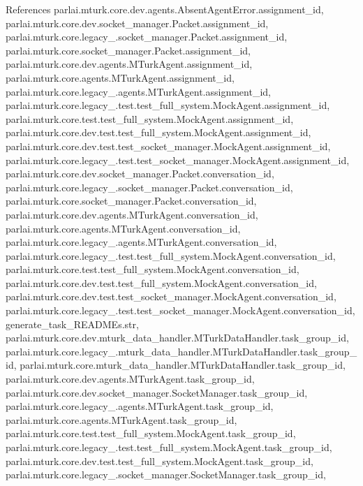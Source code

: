 References parlai.\+mturk.\+core.\+dev.\+agents.\+Absent\+Agent\+Error.\+assignment\+\_\+id, parlai.\+mturk.\+core.\+dev.\+socket\+\_\+manager.\+Packet.\+assignment\+\_\+id, parlai.\+mturk.\+core.\+legacy\+\_.\+socket\+\_\+manager.\+Packet.\+assignment\+\_\+id, parlai.\+mturk.\+core.\+socket\+\_\+manager.\+Packet.\+assignment\+\_\+id, parlai.\+mturk.\+core.\+dev.\+agents.\+M\+Turk\+Agent.\+assignment\+\_\+id, parlai.\+mturk.\+core.\+agents.\+M\+Turk\+Agent.\+assignment\+\_\+id, parlai.\+mturk.\+core.\+legacy\+\_.\+agents.\+M\+Turk\+Agent.\+assignment\+\_\+id, parlai.\+mturk.\+core.\+legacy\+\_.\+test.\+test\+\_\+full\+\_\+system.\+Mock\+Agent.\+assignment\+\_\+id, parlai.\+mturk.\+core.\+test.\+test\+\_\+full\+\_\+system.\+Mock\+Agent.\+assignment\+\_\+id, parlai.\+mturk.\+core.\+dev.\+test.\+test\+\_\+full\+\_\+system.\+Mock\+Agent.\+assignment\+\_\+id, parlai.\+mturk.\+core.\+dev.\+test.\+test\+\_\+socket\+\_\+manager.\+Mock\+Agent.\+assignment\+\_\+id, parlai.\+mturk.\+core.\+legacy\+\_.\+test.\+test\+\_\+socket\+\_\+manager.\+Mock\+Agent.\+assignment\+\_\+id, parlai.\+mturk.\+core.\+dev.\+socket\+\_\+manager.\+Packet.\+conversation\+\_\+id, parlai.\+mturk.\+core.\+legacy\+\_.\+socket\+\_\+manager.\+Packet.\+conversation\+\_\+id, parlai.\+mturk.\+core.\+socket\+\_\+manager.\+Packet.\+conversation\+\_\+id, parlai.\+mturk.\+core.\+dev.\+agents.\+M\+Turk\+Agent.\+conversation\+\_\+id, parlai.\+mturk.\+core.\+agents.\+M\+Turk\+Agent.\+conversation\+\_\+id, parlai.\+mturk.\+core.\+legacy\+\_.\+agents.\+M\+Turk\+Agent.\+conversation\+\_\+id, parlai.\+mturk.\+core.\+legacy\+\_.\+test.\+test\+\_\+full\+\_\+system.\+Mock\+Agent.\+conversation\+\_\+id, parlai.\+mturk.\+core.\+test.\+test\+\_\+full\+\_\+system.\+Mock\+Agent.\+conversation\+\_\+id, parlai.\+mturk.\+core.\+dev.\+test.\+test\+\_\+full\+\_\+system.\+Mock\+Agent.\+conversation\+\_\+id, parlai.\+mturk.\+core.\+dev.\+test.\+test\+\_\+socket\+\_\+manager.\+Mock\+Agent.\+conversation\+\_\+id, parlai.\+mturk.\+core.\+legacy\+\_.\+test.\+test\+\_\+socket\+\_\+manager.\+Mock\+Agent.\+conversation\+\_\+id, generate\+\_\+task\+\_\+\+R\+E\+A\+D\+M\+Es.\+str, parlai.\+mturk.\+core.\+dev.\+mturk\+\_\+data\+\_\+handler.\+M\+Turk\+Data\+Handler.\+task\+\_\+group\+\_\+id, parlai.\+mturk.\+core.\+legacy\+\_.\+mturk\+\_\+data\+\_\+handler.\+M\+Turk\+Data\+Handler.\+task\+\_\+group\+\_\+id, parlai.\+mturk.\+core.\+mturk\+\_\+data\+\_\+handler.\+M\+Turk\+Data\+Handler.\+task\+\_\+group\+\_\+id, parlai.\+mturk.\+core.\+dev.\+agents.\+M\+Turk\+Agent.\+task\+\_\+group\+\_\+id, parlai.\+mturk.\+core.\+dev.\+socket\+\_\+manager.\+Socket\+Manager.\+task\+\_\+group\+\_\+id, parlai.\+mturk.\+core.\+legacy\+\_.\+agents.\+M\+Turk\+Agent.\+task\+\_\+group\+\_\+id, parlai.\+mturk.\+core.\+agents.\+M\+Turk\+Agent.\+task\+\_\+group\+\_\+id, parlai.\+mturk.\+core.\+test.\+test\+\_\+full\+\_\+system.\+Mock\+Agent.\+task\+\_\+group\+\_\+id, parlai.\+mturk.\+core.\+legacy\+\_.\+test.\+test\+\_\+full\+\_\+system.\+Mock\+Agent.\+task\+\_\+group\+\_\+id, parlai.\+mturk.\+core.\+dev.\+test.\+test\+\_\+full\+\_\+system.\+Mock\+Agent.\+task\+\_\+group\+\_\+id, parlai.\+mturk.\+core.\+legacy\+\_.\+socket\+\_\+manager.\+Socket\+Manager.\+task\+\_\+group\+\_\+id, 